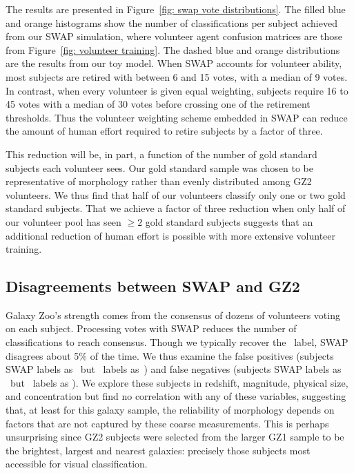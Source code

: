 The results are presented in Figure~\ref{fig: swap vote distributions}. The filled blue and orange histograms show the number of classifications per subject achieved from our SWAP simulation, where volunteer agent confusion matrices are those from Figure~\ref{fig: volunteer training}. The dashed blue and orange distributions are the results from our toy model. When SWAP accounts for volunteer ability, most subjects are retired with between 6 and 15 votes, with a median of 9 votes. In contrast, when every volunteer is given equal weighting, subjects require 16 to 45 votes with a median of 30 votes before crossing one of the retirement thresholds. Thus the volunteer weighting scheme embedded in SWAP can reduce the amount of human effort required to retire subjects by a factor of three.

This reduction will be, in part, a function of the number of gold standard subjects each volunteer sees.  Our gold standard sample was chosen to be representative of morphology rather than evenly distributed among GZ2 volunteers. We thus find that half of our volunteers classify only one or two gold standard subjects. That we achieve a factor of three reduction when only half of our volunteer pool has seen $\ge 2$ gold standard subjects suggests that an additional reduction of  human effort is possible with more extensive volunteer training.



\subsection{Disagreements between SWAP and GZ2}\label{chap3: swap gz2 disagree}

Galaxy Zoo's strength comes from the consensus of dozens of volunteers voting on each subject. Processing votes with SWAP reduces the number of classifications to reach consensus. Though we typically recover the \raw~label, SWAP disagrees about 5\% of the time. We thus examine the false positives (subjects SWAP labels as \feat~but \raw~labels as~\notfeat) and false negatives (subjects SWAP labels as \notfeat~but \raw~labels as \feat). We explore these subjects in redshift, magnitude, physical size, and concentration but find no correlation with any of these variables, suggesting that, at least for this galaxy sample, the reliability of morphology depends on factors that are not captured by these coarse measurements. This is perhaps unsurprising since GZ2 subjects were selected from the larger GZ1 sample to be the brightest, largest and nearest galaxies:  precisely those subjects most accessible for visual classification. 

